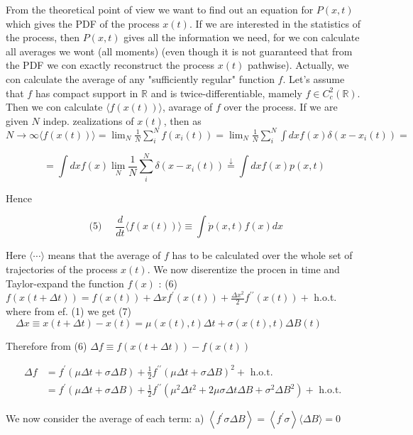 From the theoretical point of view we want to find out an equation for $P(x, t)$ which gives the PDF of the process $x(t)$. If we are interested in the statistics of the process, then $P(x, t)$ gives all the information we need, for we con
calculate all averages we wont (all moments)
(even though it is not guaranteed that from the PDF we con exactly reconstruct the process $x(t)$ pathwise).
Actually, we con calculate the average of any "sufficiently regular" function $f$.
Let's assume that $f$ has compact support in $\mathbb{R}$ and is twice-differentiable, mamely $f \in C_{c}^{2}(\mathbb{R})$.
Then we con calculate $\langle f(x(t))\rangle$, avarage of $f$ over the process. If we are given $N$ indep. zealizations of $x(t)$, then as $N \rightarrow \infty \langle f(x(t))\rangle=\lim _{N} \frac{1}{N} \sum_{i}^{N} f\left(x_{i}(t)\right)=\lim _{N} \frac{1}{N} \sum_{i}^{N} \int d x f(x) \delta\left(x-x_{i}(t)\right)=$


\begin{equation*}
=\int d x f(x) \lim _{N} \frac{1}{N} \sum_{i}^{N} \delta\left(x-x_{i}(t)\right) \stackrel{\downarrow}{=} \int d x f(x) p(x, t) \tag{35}
\end{equation*}


Hence

$$ \text { (5) } \quad \frac{d}{d t}\langle f(x(t))\rangle \equiv \int \dot{p}(x, t) f(x) d x $$

Here $\langle\cdots\rangle$ means that the average of $f$ has to be calculated over the whole set of trajectories of the process $x(t)$. We now diserentize the procen in time and Taylor-expand the function $f(x)$ :
(6) $f(x(t+\Delta t))=f(x(t))+\Delta x f^{\prime}(x(t))+\frac{\Delta x^{2}}{2} f^{\prime \prime}(x(t))+$ h.o.t.
where from ef. (1) we get
(7) $\quad \Delta x \equiv x(t+\Delta t)-x(t)=\mu(x(t), t) \Delta t+\sigma(x(t), t) \Delta B(t)$

Therefore from (6) $\Delta f \equiv f(x(t+\Delta t))-f(x(t))$

$$ \begin{aligned}
\Delta f & =f^{\prime}(\mu \Delta t+\sigma \Delta B)+\frac{1}{2} f^{\prime \prime}(\mu \Delta t+\sigma \Delta B)^{2}+\text { h.o.t. } \\ & =f^{\prime}(\mu \Delta t+\sigma \Delta B)+\frac{1}{2} f^{\prime \prime}\left(\mu^2\Delta t^2 + 2 \mu \sigma \Delta t \Delta B+\sigma^{2} \Delta B^{2}\right)+\text { h.o.t. }
\end{aligned}
$$

We now consider the average of each term:
a) $\left\langle f^{\prime} \sigma \Delta B\right\rangle=\left\langle f^{\prime} \sigma\right\rangle\langle\Delta B\rangle=0$

